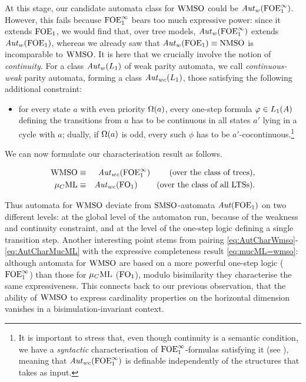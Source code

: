 At this stage, our candidate automata class for $\mathrm{WMSO}$ could be $\mathit{Aut}_{w}(\mathrm{FOE}^{\infty}_1)$. However, this fails because $\mathrm{FOE}^{\infty}_1$ bears too much expressive power: since it extends $\mathrm{FOE}_1$,
we would find that, over tree models, $\mathit{Aut}_{w}(\mathrm{FOE}^{\infty}_1)$ extends
$\mathit{Aut}_{w}(\mathrm{FOE}_1)$, whereas we already saw that $\mathit{Aut}_{w}(\mathrm{FOE}_1) \equiv
\mathrm{NMSO}$ is incomparable to $\mathrm{WMSO}$.
%
It is here that we crucially involve the notion of \emph{continuity}. 
For a class $\mathit{Aut}_{w}(L_{1})$ of weak parity automata, we call 
\emph{continuous-weak} parity automata, forming a class $\mathit{Aut}_{wc}(L_{1})$, those
satisfying the following additional constraint:
\begin{itemize}
\item 
for every state $a$ with even priority $\Omega(a)$, every one-step formula $\varphi
\in L_{1}(A)$ defining the transitions from $a$ has to be continuous in all
states $a'$ lying in a cycle with $a$;
dually, if $\Omega(a)$ is odd, every such $\phi$ has to be $a'$-cocontinuous.\footnote{%
   It is important to stress that, even though continuity is a semantic 
   condition, we have a \emph{syntactic} characterisation of $\mathrm{FOE}^{\infty}_1$-formulas
   satisfying it (see \cite{carr:mode18}), meaning that 
   $\mathit{Aut}_{wc}(\mathrm{FOE}^{\infty}_1)$ is definable independently of the structures that takes as
   input.
   }
\end{itemize}
We can now formulate our characterisation result as follows.
\begin{theorem}
\begin{eqnarray}
\wmso & \equiv & \AutWC(\ofoei)
 \qquad  \text{ (over the class of trees)}, \label{eq:AutCharWmso}
\\ \mucML & \equiv & \AutWC(\ofo)\label{eq:AutCharMucML}
  \qquad \text{ (over the class of all LTSs)}.
\end{eqnarray}
\end{theorem}
Thus automata for $\mathrm{WMSO}$ deviate from $\mathrm{SMSO}$-automata $\mathit{Aut}(\mathrm{FOE}_1)$ on two
different levels: at the global level of the automaton run, because of the 
weakness and continuity constraint, and at the level of the one-step logic 
defining a single transition step. 
Another interesting point stems from pairing
\eqref{eq:AutCharWmso}-\eqref{eq:AutCharMucML} with the expressive completeness
result \eqref{eq:mucML=wmso}: although automata for $\mathrm{WMSO}$ are based on a more
powerful one-step logic ($\mathrm{FOE}^{\infty}_1$) than those for $\mu_{C}\mathrm{ML}$ ($\mathrm{FO}_1$), modulo 
bisimilarity they characterise the same expressiveness.
This connects back to our previous observation, that the ability of $\mathrm{WMSO}$ to 
express cardinality properties on the horizontal dimension vanishes in a 
bisimulation-invariant context. 


